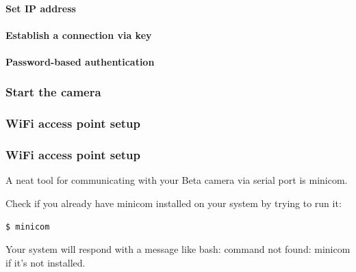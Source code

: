 \paragraph{Set IP address}
\paragraph{Establish a connection via key}
\paragraph{Password-based authentication}
\subsubsection{Start the camera}
\subsubsection{WiFi access point setup}

\subsubsection{WiFi access point setup}

\newcommand{\importantKeyword}[1]{\colorbox{keywordBack}{\textcolor{BrickRed}{#1}}}
A neat tool for communicating with your Beta camera via serial port is \importantKeyword{minicom}.

Check if you already have minicom installed on your system by trying to run it:

\begin{lstlisting}[language=bash,morekeywords=$,keywordstyle=\bfseries,frame=none,xleftmargin=.25in,belowskip=2em, aboveskip=2em]
$ minicom
\end{lstlisting}
Your system will respond with a message like bash: command not found: minicom if it's not installed.
